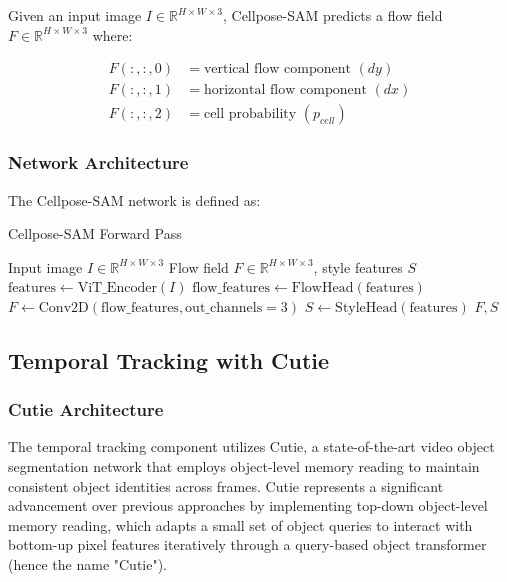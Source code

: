 \documentclass[12pt]{article}
\begin{document}
Given an input image $I \in \mathbb{R}^{H \times W \times 3}$, Cellpose-SAM predicts a flow field $F \in \mathbb{R}^{H \times W \times 3}$ where:

\begin{align}
  F(:,:,0) & = \text{vertical flow component } (dy)   \\
  F(:,:,1) & = \text{horizontal flow component } (dx) \\
  F(:,:,2) & = \text{cell probability } (p_{cell})
\end{align}

\subsubsection{Network Architecture}

The Cellpose-SAM network is defined as:

\begin{algorithm}[H]
  \caption{Cellpose-SAM Forward Pass}
  \begin{algorithmic}[1]
    \REQUIRE Input image $I \in \mathbb{R}^{H \times W \times 3}$
    \ENSURE Flow field $F \in \mathbb{R}^{H \times W \times 3}$, style features $S$
    \STATE $\text{features} \leftarrow \text{ViT\_Encoder}(I)$
    \STATE $\text{flow\_features} \leftarrow \text{FlowHead}(\text{features})$
    \STATE $F \leftarrow \text{Conv2D}(\text{flow\_features}, \text{out\_channels}=3)$
    \STATE $S \leftarrow \text{StyleHead}(\text{features})$
    \RETURN $F, S$
  \end{algorithmic}
\end{algorithm}

\subsection{Temporal Tracking with Cutie}

\subsubsection{Cutie Architecture}

The temporal tracking component utilizes Cutie, a state-of-the-art video object segmentation network that employs object-level memory reading to maintain consistent object identities across frames. Cutie represents a significant advancement over previous approaches by implementing top-down object-level memory reading, which adapts a small set of object queries to interact with bottom-up pixel features iteratively through a query-based object transformer (hence the name "Cutie").
\end{document}
